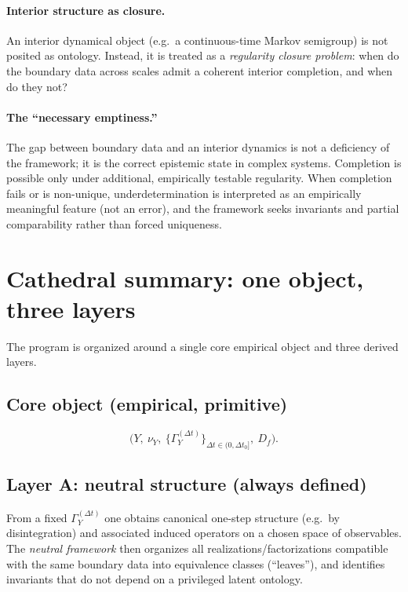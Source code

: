 \documentclass[11pt]{article}
\begin{document}
\paragraph{Interior structure as closure.}
An interior dynamical object (e.g.\ a continuous-time Markov semigroup) is not posited as ontology.
Instead, it is treated as a \emph{regularity closure problem}: when do the boundary data across scales
admit a coherent interior completion, and when do they not?

\paragraph{The ``necessary emptiness.''}
The gap between boundary data and an interior dynamics is not a deficiency of the framework; it is the
correct epistemic state in complex systems. Completion is possible only under additional, empirically
testable regularity. When completion fails or is non-unique, underdetermination is interpreted as an
empirically meaningful feature (not an error), and the framework seeks invariants and partial
comparability rather than forced uniqueness.

\section{Cathedral summary: one object, three layers}
The program is organized around a single core empirical object and three derived layers.

\subsection*{Core object (empirical, primitive)}
\begin{equation}
\Big(Y,\ \nu_Y,\ \{\Gamma_Y^{(\Delta t)}\}_{\Delta t\in(0,\Delta t_0]},\ D_f\Big).
\end{equation}

\subsection*{Layer A: neutral structure (always defined)}
From a fixed $\Gamma_Y^{(\Delta t)}$ one obtains canonical one-step structure (e.g.\ by disintegration)
and associated induced operators on a chosen space of observables. The \emph{neutral framework} then
organizes all realizations/factorizations compatible with the same boundary data into equivalence
classes (``leaves''), and identifies invariants that do not depend on a privileged latent ontology.
\end{document}
